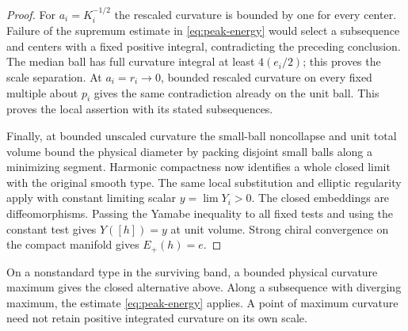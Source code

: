 \begin{proof}
For \(a_i=K_i^{-1/2}\) the rescaled curvature is bounded by one for
every center. Failure of the supremum estimate in
\eqref{eq:peak-energy} would select a subsequence and centers with
a fixed positive integral, contradicting the preceding conclusion.
The median ball has full curvature integral at least \(4(e_i/2)\);
this proves the scale separation. At \(a_i=r_i\to0\), bounded
rescaled curvature on every fixed multiple about \(p_i\) gives the
same contradiction already on the unit ball. This proves the
local assertion with its stated subsequences.

Finally, at bounded unscaled curvature the small-ball noncollapse
and unit total volume bound the physical diameter by packing
disjoint small balls along a minimizing segment. Harmonic compactness
now identifies a whole closed limit with the original smooth type.
The same local substitution and elliptic regularity apply with
constant limiting scalar \(y=\lim Y_i>0\). The closed embeddings
are diffeomorphisms. Passing the Yamabe inequality to all fixed tests
and using the constant test gives \(Y([h])=y\) at unit volume.
Strong chiral convergence on the compact manifold gives \(E_+(h)=e\).
\end{proof}

On a nonstandard type in the surviving band, a bounded physical curvature
maximum gives the closed alternative above. Along a subsequence with
diverging maximum, the estimate \eqref{eq:peak-energy} applies. A point of maximum curvature
need not retain positive integrated curvature on its own scale.

